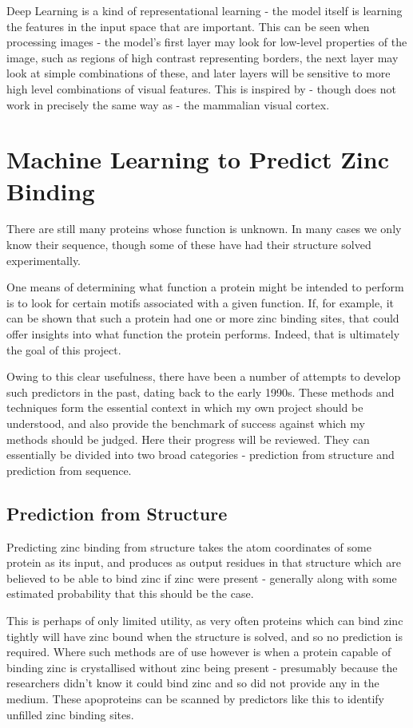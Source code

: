 Deep Learning is a kind of representational learning - the model itself is learning the features in the input space that are important. This can be seen when processing images - the model's first layer may look for low-level properties of the image, such as regions of high contrast representing borders, the next layer may look at simple combinations of these, and later layers will be sensitive to more high level combinations of visual features. This is inspired by - though does not work in precisely the same way as - the mammalian visual cortex.


\section{Machine Learning to Predict Zinc Binding}

There are still many proteins whose function is unknown. In many cases we only know their sequence, though some of these have had their structure solved experimentally.

One means of determining what function a protein might be intended to perform is to look for certain motifs associated with a given function. If, for example, it can be shown that such a protein had one or more zinc binding sites, that could offer insights into what function the protein performs. Indeed, that is ultimately the goal of this project.

Owing to this clear usefulness, there have been a number of attempts to develop such predictors in the past, dating back to the early 1990s. These methods and techniques form the essential context in which my own project should be understood, and also provide the benchmark of success against which my methods should be judged. Here their progress will be reviewed. They can essentially be divided into two broad categories - prediction from structure and prediction from sequence.

\subsection{Prediction from Structure}

Predicting zinc binding from structure takes the atom coordinates of some protein as its input, and produces as output residues in that structure which are believed to be able to bind zinc if zinc were present - generally along with some estimated probability that this should be the case.

This is perhaps of only limited utility, as very often proteins which can bind zinc tightly will have zinc bound when the structure is solved, and so no prediction is required. Where such methods are of use however is when a protein capable of binding zinc is crystallised without zinc being present - presumably because the researchers didn't know it could bind zinc and so did not provide any in the medium. These apoproteins can be scanned by predictors like this to identify unfilled zinc binding sites. 

